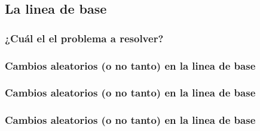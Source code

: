 \documentclass{beamer}
\begin{document}
\subsection{La linea de base}
\begin{frame}
  \begin{center}
    \Huge{\color{blue}{Las electrónicas: \\ La linea de base}}
  \end{center}
\end{frame}

\subsubsection{¿Cuál el el problema a resolver?}

\begin{frame}
  \frametitle{Cambios aleatorios (o no tanto) en la linea de base}
  \begin{block}{}
    \centering
  \end{block}
\end{frame}

\begin{frame}
  \frametitle{Cambios aleatorios (o no tanto) en la linea de base}
  \begin{block}{}
    \centering
  \end{block}
\end{frame}

\begin{frame}
  \frametitle{Cambios aleatorios (o no tanto) en la linea de base}
  \begin{block}{}
    \centering
  \end{block}
\end{frame}
\end{document}
